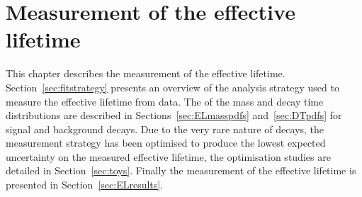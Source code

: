 \chapter{Measurement of the \boldmath{\bsmumu} effective lifetime}
\label{sec:lifetimemeasurement}

This chapter describes the measurement of the \bsmumu effective lifetime. %
Section~\ref{sec:fitstrategy} presents an overview of the analysis strategy used to measure the \bsmumu effective lifetime from data. %
The \pdfs of the mass and decay time distributions are described in Sections~\ref{sec:ELmasspdfs} and~\ref{sec:DTpdfs} for signal and background decays. Due to the very rare nature of \bsmumu decays, the measurement strategy has been optimised to produce the lowest expected uncertainty on the measured \bsmumu effective lifetime, the optimisation studies are detailed in Section~\ref{sec:toys}. Finally the measurement of the \bsmumu effective lifetime is presented in Section~\ref{sec:ELresults}.







